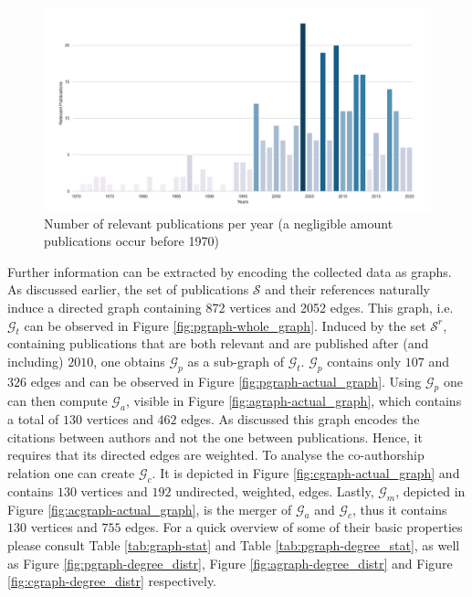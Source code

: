 \documentclass[11pt,a4paper]{book}
\theoremstyle{definition}
\theoremstyle{definition}
\theoremstyle{definition}
\theoremstyle{remark}
\newcommand{\xset}{\mathcal{S}}
\newcommand{\tgraph}{\mathcal{G}_{t}}
\newcommand{\pgraph}{\mathcal{G}_{p}}
\newcommand{\agraph}{\mathcal{G}_{a}}
\newcommand{\cgraph}{\mathcal{G}_{c}}
\newcommand{\acgraph}{\mathcal{G}_{m}}
\begin{document}
\begin{figure}[h]
\includegraphics[width=\textwidth]{relevant_publications_per_year.png}
\caption{Number of relevant publications per year (a negligible amount publications occur before 1970)}
\label{fig:pgraph-relevant_publications_per_year}
\end{figure}



Further information can be extracted by encoding the collected data as graphs. As discussed earlier, the set of publications $\xset$ and their references naturally induce a directed 
graph containing 872 vertices and 2052 edges. This graph, i.e.\ $\tgraph$ can be observed in Figure \ref{fig:pgraph-whole_graph}.
Induced by the set $\xset^r$, containing publications that are both relevant and are published after (and including) $2010$, one obtains $\pgraph$ as a sub-graph of $\tgraph$.
$\pgraph$ contains only $107$ and $326$ edges and can be observed in Figure \ref{fig:pgraph-actual_graph}.
Using $\pgraph$ one can then compute $\agraph$, visible in Figure \ref{fig:agraph-actual_graph}, which contains a total of $130$ vertices and $462$ edges. As discussed this graph encodes the citations between authors and not the one between publications. Hence, it requires that its directed edges are weighted. 
To analyse the co-authorship relation one can create $\cgraph$. It is depicted in Figure \ref{fig:cgraph-actual_graph} and contains $130$ vertices and $192$ undirected, weighted, edges.
Lastly, $\acgraph$, depicted in Figure \ref{fig:acgraph-actual_graph}, is the merger of $\agraph$ and $\cgraph$, thus it contains $130$ vertices and $755$ edges. 
For a quick overview of some of their basic properties please consult Table \ref{tab:graph-stat} and Table  \ref{tab:pgraph-degree_stat}, as well as Figure \ref{fig:pgraph-degree_distr},  Figure \ref{fig:agraph-degree_distr} and  Figure \ref{fig:cgraph-degree_distr} respectively.
\end{document}
